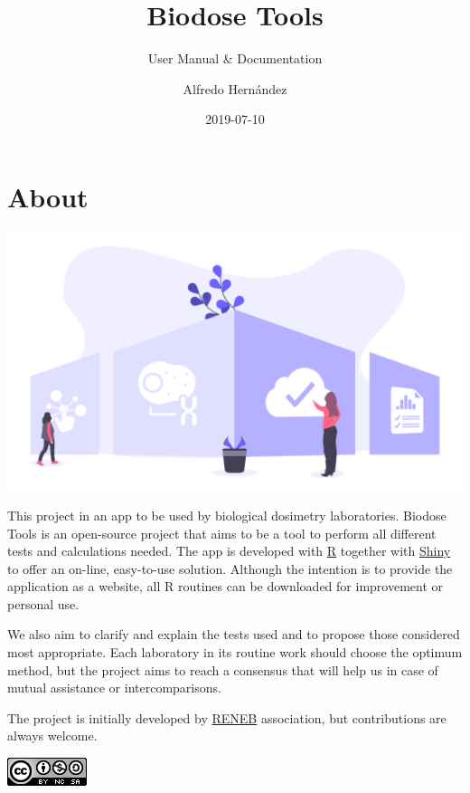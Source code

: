 \documentclass[]{scrartcl}
\title{Biodose Tools}
\subtitle{User Manual \& Documentation}
\author{Alfredo Hernández}
\date{2019-07-10}
\begin{document}

\maketitle

{
\setcounter{tocdepth}{2}
\tableofcontents
}
\hypertarget{about}{%
\section*{About}\label{about}}

\includegraphics{images/home.pdf}

This project in an app to be used by biological dosimetry laboratories. Biodose Tools is an open-source project that aims to be a tool to perform all different tests and calculations needed. The app is developed with \href{https://www.r-project.org/about.html}{R} \citep{R-base} together with \href{https://shiny.rstudio.com}{Shiny} \citep{R-shiny} to offer an on-line, easy-to-use solution. Although the intention is to provide the application as a website, all R routines can be downloaded for improvement or personal use.

We also aim to clarify and explain the tests used and to propose those considered most appropriate. Each laboratory in its routine work should choose the optimum method, but the project aims to reach a consensus that will help us in case of mutual assistance or intercomparisons.

The project is initially developed by \href{http://www.reneb.net}{RENEB} association, but contributions are always welcome.

\begin{center}\includegraphics[width=0.92in]{images/by-nc-sa} \end{center}
\end{document}
